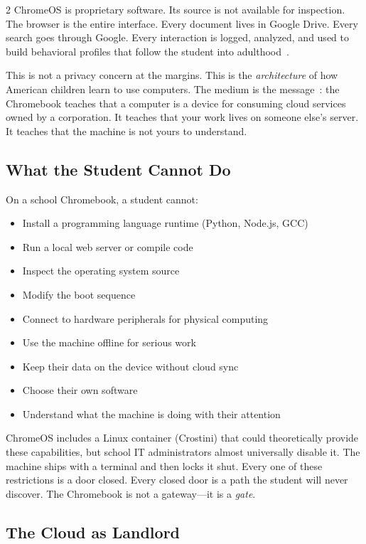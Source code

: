 \documentclass[11pt, a4paper]{article}
\begin{document}
\begin{multicols}{2}
ChromeOS is proprietary software. Its source is not available for inspection. The browser is the entire interface. Every document lives in Google Drive. Every search goes through Google. Every interaction is logged, analyzed, and used to build behavioral profiles that follow the student into adulthood~\citep{zuboff2019surveillance}.

This is not a privacy concern at the margins. This is the \emph{architecture} of how American children learn to use computers. The medium is the message~\citep{mcluhan1964understanding}: the Chromebook teaches that a computer is a device for consuming cloud services owned by a corporation. It teaches that your work lives on someone else's server. It teaches that the machine is not yours to understand.

\subsection{What the Student Cannot Do}

On a school Chromebook, a student cannot:

\begin{itemize}
  \item Install a programming language runtime (Python, Node.js, GCC)
  \item Run a local web server or compile code
  \item Inspect the operating system source
  \item Modify the boot sequence
  \item Connect to hardware peripherals for physical computing
  \item Use the machine offline for serious work
  \item Keep their data on the device without cloud sync
  \item Choose their own software
  \item Understand what the machine is doing with their attention
\end{itemize}

ChromeOS includes a Linux container (Crostini) that could theoretically provide these capabilities, but school IT administrators almost universally disable it. The machine ships with a terminal and then locks it shut. Every one of these restrictions is a door closed. Every closed door is a path the student will never discover. The Chromebook is not a gateway---it is a \emph{gate}.

\subsection{The Cloud as Landlord}


\end{multicols}
\end{document}
